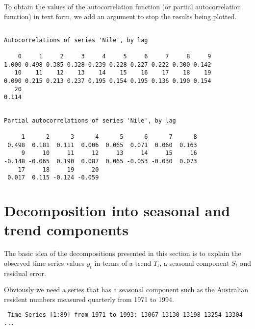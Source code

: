 To obtain the values of the autocorrelation function (or partial autocorrelation function) in text form, we add an argument to stop the results being plotted. 
\begin{knitrout}
\color{fgcolor}\begin{kframe}
\begin{alltt}
\hlstd{> } \hlstd{=}\hlstd{)}
\end{alltt}
\begin{verbatim}

Autocorrelations of series 'Nile', by lag

    0     1     2     3     4     5     6     7     8     9 
1.000 0.498 0.385 0.328 0.239 0.228 0.227 0.222 0.300 0.142 
   10    11    12    13    14    15    16    17    18    19 
0.090 0.215 0.213 0.237 0.195 0.154 0.195 0.136 0.190 0.154 
   20 
0.114 
\end{verbatim}
\begin{alltt}
\hlstd{> } \hlstd{=}\hlstd{)}
\end{alltt}
\begin{verbatim}

Partial autocorrelations of series 'Nile', by lag

     1      2      3      4      5      6      7      8 
 0.498  0.181  0.111  0.006  0.065  0.071  0.060  0.163 
     9     10     11     12     13     14     15     16 
-0.148 -0.065  0.190  0.087  0.065 -0.053 -0.030  0.073 
    17     18     19     20 
 0.017  0.115 -0.124 -0.059 
\end{verbatim}
\end{kframe}
\end{knitrout}
 
\section{Decomposition into seasonal and trend components} 
 
The basic idea of the decompositions presented in this section is to explain the observed time series values $y_t$ in terms of a trend $T_t$, a seasonal component $S_t$ and residual error. 
 
Obviously we need a series that has a seasonal component such as the Australian resident numbers measured quarterly from  1971 to 1994. 
\begin{knitrout}
\color{fgcolor}\begin{kframe}
\begin{alltt}
\hlstd{> }
\end{alltt}
\begin{verbatim}
 Time-Series [1:89] from 1971 to 1993: 13067 13130 13198 13254 13304 ...
\end{verbatim}
\end{kframe}
\end{knitrout}
 
